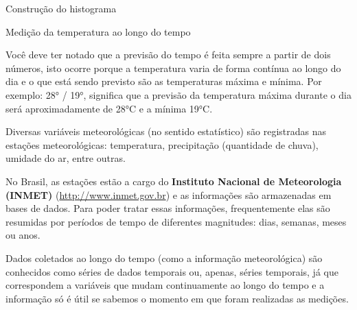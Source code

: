 {\begin{task}{Construção do histograma}








\end{task}

\label{est1-ativ-10}
\begin{task}{Medição da temperatura ao longo do tempo}

Você deve ter notado que a previsão do tempo é feita sempre a partir de dois números, isto ocorre porque a temperatura varia de forma contínua ao longo do dia e o que está sendo previsto são as temperaturas máxima e mínima. Por exemplo: 28° / 19°, significa que a previsão da temperatura máxima durante o dia será aproximadamente de 28°C e a mínima 19°C.

Diversas variáveis meteorológicas (no sentido estatístico) são registradas nas estações meteorológicas: temperatura, precipitação (quantidade de chuva), umidade do ar, entre outras.

No Brasil, as estações estão a cargo do \textbf {Instituto Nacional de Meteorologia (INMET)} (\href{http://www.inmet.gov.br}{http://www.inmet.gov.br}) e as informações são armazenadas em bases de dados. Para poder tratar essas informações, frequentemente elas são resumidas por períodos de tempo de diferentes magnitudes: dias, semanas, meses ou anos.

Dados coletados ao longo do tempo (como a informação meteorológica) são conhecidos como séries de dados temporais ou, apenas, séries temporais, já que correspondem a variáveis que mudam continuamente ao longo do tempo e a informação só é útil se sabemos o momento em que foram realizadas as medições.


\end{task}}
